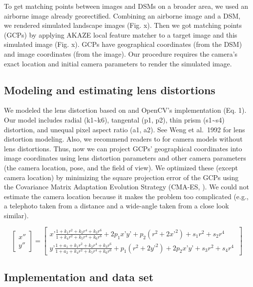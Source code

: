 \documentclass{article}
\begin{document}
To get matching points between images and DSMs on a broader area, we
used an airborne image already georectified. Combining an airborne image
and a DSM, we rendered simulated landscape images (Fig. x). Then we got
matching points (GCPs) by applying AKAZE local feature matcher to a
target image and this simulated image (Fig. x). GCPs have geographical
coordinates (from the DSM) and image coordinates (from the image). Our
procedure requires the camera's exact location and initial camera
parameters to render the simulated image.

\hypertarget{modeling-and-estimating-lens-distortions}{%
\subsection{Modeling and estimating lens
distortions}\label{modeling-and-estimating-lens-distortions}}

We modeled the lens distortion based on \cite{Weng1992CameraCalib} and
OpenCV's implementation (Eq. 1). Our model includes radial
(k1\textasciitilde k6), tangental (p1, p2), thin prism
(s1\textasciitilde s4) distortion, and unequal pixel aspect ratio (a1,
a2). See Weng et al.~1992 for lens distortion modeling. Also, we
recommend readers to \cite{Portenier2020Cryosphere} for camera models
without lens distortions. Thus, now we can project GCPs' geographical
coordinates into image coordinates using lens distortion parameters and
other camera parameters (the camera location, pose, and the field of
view). We optimized these (except camera location) by minimizing the
square projection error of the GCPs using the Covariance Matrix
Adaptation Evolution Strategy (CMA-ES, \cite{Hansen2003CMAES}). We could
not estimate the camera location because it makes the problem too
complicated (e.g., a telephoto taken from a distance and a wide-angle
taken from a close look similar).

\[
\begin{bmatrix}
{x}'' \\ 
{y}'' 
\end{bmatrix} 
= 
\begin{bmatrix} 
x’ \frac{1 + k_1 r^2 + k_2 r^4 + k_3 r^6}{1 + k_4 r^2 + k_5 r^4 + k_6 r^6} + 2 p_1 x’ y’ + p_2(r^2 + 2 x’^2) + s_1 r^2 + s_2 r^4 \\ 
y’ \frac{1 + a_1 + k_1 r^2 + k_2 r^4 + k_3 r^6}{1 + a_2 + k_4 r^2 + k_5 r^4 + k_6 r^6} + p_1 (r^2 + 2 y’^2) + 2 p_2 x’ y’ + s_3 r^2 + s_4 r^4 \ \end{bmatrix}
\]

\hypertarget{implementation-and-data-set}{%
\subsection{Implementation and data
set}\label{implementation-and-data-set}}
\end{document}
